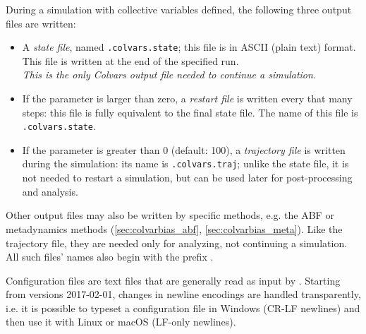 
During a simulation with collective variables defined, the following three output files are written:

\begin{itemize}

\item A \emph{state file}, named \outputName\texttt{.colvars.state}; this file is in ASCII (plain text) format.  This file is written at the end of the specified run.\\
  \emph{This is the only Colvars output file needed to continue a simulation.}

\item If the parameter  is larger than zero, a \emph{restart file} is written every that many steps: this file is fully equivalent to the final state file.
  The name of this file is \restartName\texttt{.colvars.state}.

\item If the parameter  is greater than 0 (default: 100), a \emph{trajectory file} is written during the simulation: its name is \outputName\texttt{.colvars.traj}; unlike the state file, it is not needed to restart a simulation, but can be used later for post-processing and analysis.

\end{itemize}

Other output files may also be written by specific methods, e.g.{} the ABF or metadynamics methods (\ref{sec:colvarbias_abf}, \ref{sec:colvarbias_meta}).
Like the trajectory file, they are needed only for analyzing, not continuing a simulation.
All such files' names also begin with the prefix \outputName.





Configuration files are text files that are generally read as input by \MDENGINE{}.
Starting from versions 2017-02-01, changes in newline encodings are handled transparently, i.e.{} it is possible to typeset a configuration file in Windows (CR-LF newlines) and then use it with Linux or macOS (LF-only newlines).

